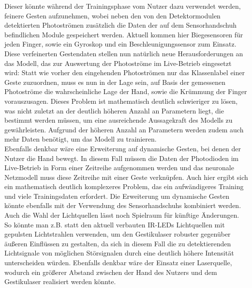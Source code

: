 Dieser könnte während der Trainingsphase vom Nutzer dazu verwendet werden, feinere Gesten aufzunehmen, wobei neben den von den Detektormodulen detektierten Photoströmen zusätzlich die Daten der auf dem Sensorhandschuh befindlichen Module gespeichert werden. Aktuell kommen hier Biegesensoren für jeden Finger, sowie ein Gyroskop und ein Beschleunigungssensor zum Einsatz. Diese verfeinerten Gestendaten stellen nun natürlich neue Herausforderungen an das Modell, das zur Auswertung der Photoströme im Live-Betrieb eingesetzt wird: Statt wie vorher den eingehenden Photoströmen nur das Klassenlabel einer Geste zuzuordnen, muss es nun in der Lage sein, auf Basis der gemessenen Photoströme die wahrscheinliche Lage der Hand, sowie die Krümmung der Finger vorauszusagen. Dieses Problem ist mathematisch deutlich schwieriger zu lösen, was nicht zuletzt an der deutlich höheren Anzahl an Parametern liegt, die bestimmt werden müssen, um eine ausreichende Aussagekraft des Modells zu gewährleisten. Aufgrund der höheren Anzahl an Parametern werden zudem auch mehr Daten benötigt, um das Modell zu trainieren. \\
Ebenfalls denkbar wäre eine Erweiterung auf dynamische Gesten, bei denen der Nutzer die Hand bewegt. In diesem Fall müssen die Daten der Photodioden im Live-Betrieb in Form einer Zeitreihe aufgenommen werden und das neuronale Netzmodell muss diese Zeitreihe mit einer Geste verknüpfen. Auch hier ergibt sich ein mathematisch deutlich komplexeres Problem, das ein aufwändigeres Training und viele Trainingsdaten erfordert. Die Erweiterung um dynamische Gesten könnte ebenfalls mit der Verwendung des Sensorhandschuhs kombiniert werden. \\
Auch die Wahl der Lichtquellen lässt noch Spielraum für künftige Änderungen. So könnte man z.B. statt den aktuell verbauten IR-LEDs Lichtquellen mit gepulsten Lichtstrahlen verwenden, um den Gestikulaser robuster gegenüber äußeren Einflüssen zu gestalten, da sich in diesem Fall die zu detektierenden Lichtsignale von möglichen Störsignalen durch eine deutlich höhere Intensität unterscheiden würden. Ebenfalls denkbar wäre der Einsatz einer Laserquelle, wodurch ein größerer Abstand zwischen der Hand des Nutzers und dem Gestikulaser realisiert werden könnte.